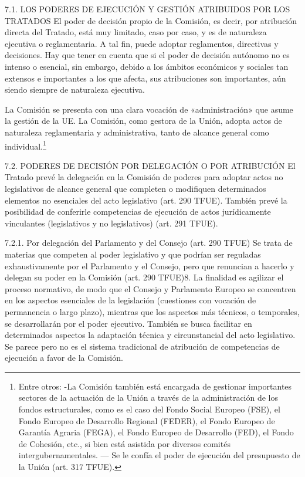 \documentclass[10pt,a4paper]{article}
\begin{document}
7.1. LOS PODERES DE EJECUCIÓN Y GESTIÓN ATRIBUIDOS POR LOS
TRATADOS
El poder de decisión propio de la Comisión, es decir, por atribución directa del Tratado, está muy limitado, caso por caso, y es de naturaleza ejecutiva o reglamentaria. A tal fin, puede adoptar reglamentos, directivas y decisiones. Hay que tener en cuenta que si el poder de decisión autónomo no es intenso o esencial, sin embargo, debido a los ámbitos económicos y sociales tan extensos e importantes a los que afecta, sus atribuciones son importantes, aún siendo siempre de naturaleza ejecutiva.

La Comisión se presenta con una clara vocación de «administración» que asume la gestión de la UE. La Comisión, como gestora de la Unión, adopta actos de naturaleza reglamentaria y administrativa, tanto de alcance general como individual.\footnote{
Entre otros:
-La Comisión también está encargada de gestionar importantes sectores de la actuación de la Unión a través de la administración de los fondos estructurales, como es el caso del Fondo Social Europeo (FSE), el Fondo Europeo de Desarrollo Regional (FEDER), el Fondo Europeo de Garantía Agraria (FEGA), el Fondo Europeo de Desarrollo (FED), el Fondo de Cohesión, etc., si bien está asistida por diversos comités intergubernamentales. — Se le confía el poder de ejecución del presupuesto de la Unión (art. 317 TFUE).
}


7.2. PODERES DE DECISIÓN POR DELEGACIÓN O POR ATRIBUCIÓN
El Tratado prevé la delegación en la Comisión de poderes para adoptar actos no legislativos de alcance general que completen o modifiquen determinados elementos no esenciales del acto legislativo (art. 290 TFUE). También prevé la posibilidad de conferirle competencias de ejecución de actos jurídicamente vinculantes (legislativos y no legislativos) (art. 291 TFUE).

7.2.1. Por delegación del Parlamento y del Consejo (art. 290 TFUE) 
Se trata de materias que competen al poder legislativo y que podrían ser reguladas exhaustivamente por el Parlamento y el Consejo, pero que renuncian a hacerlo y delegan su poder en la Comisión (art. 290 TFUE)8. La finalidad es agilizar el proceso normativo, de modo que el Consejo y Parlamento Europeo se concentren en los aspectos esenciales de la legislación (cuestiones con vocación de permanencia o largo plazo), mientras que los aspectos más técnicos, o temporales, se desarrollarán por el poder ejecutivo. También se busca facilitar en determinados aspectos la adaptación técnica y circunstancial del acto legislativo. Se parece pero no es el sistema tradicional de atribución de competencias de ejecución a favor de la Comisión.
\end{document}
